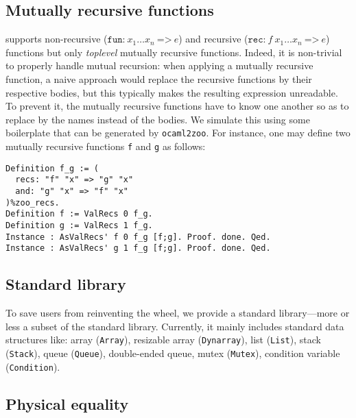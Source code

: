 \subsection{Mutually recursive functions}

\Zoo supports non-recursive ($\texttt{fun:}\ x_1 \dots x_n\ \texttt{=>}\ e$) and recursive ($\texttt{rec:}\ f\ x_1 \dots x_n\ \texttt{=>}\ e$) functions but only \emph{toplevel} mutually recursive functions.
Indeed, it is non-trivial to properly handle mutual recursion: when applying a mutually recursive function, a naive approach would replace the recursive functions by their respective bodies, but this typically makes the resulting expression unreadable.
To prevent it, the mutually recursive functions have to know one another so as to replace by the names instead of the bodies.
We simulate this using some boilerplate that can be generated by \texttt{ocaml2zoo}.
For instance, one may define two mutually recursive functions \texttt{f} and \texttt{g} as follows:

\begin{verbatim}
Definition f_g := (
  recs: "f" "x" => "g" "x"
  and: "g" "x" => "f" "x"
)%zoo_recs.
Definition f := ValRecs 0 f_g.
Definition g := ValRecs 1 f_g.
Instance : AsValRecs' f 0 f_g [f;g]. Proof. done. Qed.
Instance : AsValRecs' g 1 f_g [f;g]. Proof. done. Qed.
\end{verbatim}

\subsection{Standard library}

To save users from reinventing the wheel, we provide a standard library---more or less a subset of the \OCaml standard library.
Currently, it mainly includes standard data structures like: array (\texttt{Array}), resizable array (\texttt{Dynarray}), list (\texttt{List}), stack (\texttt{Stack}), queue (\texttt{Queue}), double-ended queue, mutex (\texttt{Mutex}), condition variable (\texttt{Condition}).

\subsection{Physical equality}

